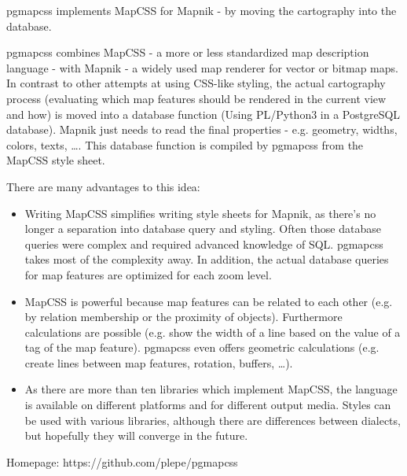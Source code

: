 %
{pgmapcss implements MapCSS for Mapnik - by moving the cartography into the database.}%
{}%
{pgmapcss combines MapCSS - a more or less standardized map description language - with Mapnik - a widely used map renderer for vector or bitmap maps. In contrast to other attempts at using CSS-like styling, the actual cartography process (evaluating which map features should be rendered  in the current view and how) is moved into a database function (Using PL/Python3 in a PostgreSQL database). Mapnik just needs to read the final properties - e.g. geometry, widths, colors, texts, …. This database function is compiled by pgmapcss from the MapCSS style sheet.

\noindent There are many advantages to this idea:
\begin{itemize}
\item Writing MapCSS simplifies writing style sheets for Mapnik, as there's no longer a separation into database query and styling. Often those database queries were complex and required advanced knowledge of SQL. pgmapcss takes most of the complexity away. In addition, the actual database queries for map features are optimized for each zoom level.
\item MapCSS is powerful because map features can be related to each other (e.g. by relation membership or the proximity of objects). Furthermore calculations are possible (e.g. show the width of a line based on the value of a tag of the map feature). pgmapcss even offers geometric calculations (e.g. create lines between map features, rotation, buffers, …).
\item As there are more than ten libraries which implement MapCSS, the language is available on different platforms and for different output media. Styles can be used with various libraries,  although there are differences between dialects, but hopefully they will converge in the future.
\end{itemize}

Homepage: https://github.com/plepe/pgmapcss}


